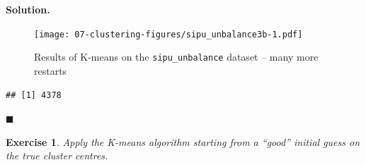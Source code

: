 \documentclass[10pt,b5paper,krantz1]{krantz}
\newenvironment{Shaded}{\begin{snugshade}}{\end{snugshade}}
\newcommand{\NormalTok}[1]{#1}
\newcommand{\OperatorTok}[1]{\textcolor[rgb]{0.43,0.43,0.43}{\textbf{#1}}}
\newtheorem{exercise}{Exercise}[chapter]
\newenvironment{solution}{%
\bigskip\noindent\textbf{Solution. }%
\it\ignorespaces%
\ignorespaces%
}{\ignorespaces%
\hfill$\blacksquare$%
}
\begin{document}
\begin{solution}
\begin{figure}
\hypertarget{fig:sipu_unbalance3b}{%
\centering
\texttt{[image: 07-clustering-figures/sipu\_unbalance3b-1.pdf]}
\caption{Results of K-means on the \texttt{sipu\_unbalance} dataset -- many more restarts}\label{fig:sipu_unbalance3b}
}
\end{figure}

\begin{Shaded}
\end{Shaded}

\begin{verbatim}
## [1] 4378
\end{verbatim}

\end{solution}

\begin{exercise}

Apply the K-means algorithm starting from a ``good'' initial guess
on the true cluster centres.

\end{exercise}
\end{document}
